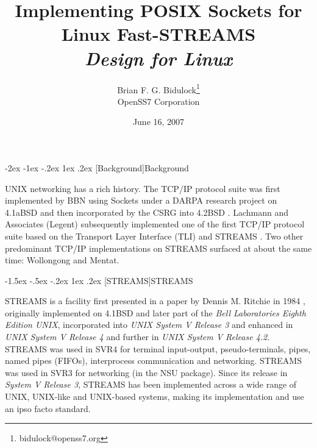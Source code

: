 \documentclass[letterpaper,final,notitlepage,twocolumn,10pt,twoside]{article}
\makeatletter
\renewcommand\section{\@startsection {section}{1}{\z@}%
                                   {-2ex \@plus -1ex \@minus -.2ex}%
                                   {1ex \@plus .2ex}%
                                   {\normalfont\large\bfseries}}
\renewcommand\subsection{\@startsection{subsection}{2}{\z@}%
                                     {-1.5ex \@plus -.5ex \@minus -.2ex}%
                                     {1ex \@plus .2ex}%
                                     {\normalfont\normalsize\bfseries}}
\makeatother
\begin{document}

\title{Implementing POSIX Sockets for Linux Fast-STREAMS\\[0.5ex]
	{\large \textsl{Design for Linux}}}
\author{Brian F. G. Bidulock\thanks{bidulock@openss7.org}\\
	OpenSS7 Corporation}
\date{June 16, 2007}
\maketitle

\begin{abstract}
\end{abstract}


\section[Background]{Background}

UNIX networking has a rich history.  The TCP/IP protocol suite was first
implemented by BBN using Sockets under a DARPA research project on 4.1aBSD and
then incorporated by the CSRG into 4.2BSD \cite[]{bsd}.  Lachmann and
Associates (Legent) subsequently implemented one of the first TCP/IP protocol
suite based on the Transport Layer Interface (TLI) \cite[]{tli} and STREAMS
\cite[]{magic}.  Two other predominant TCP/IP implementations on STREAMS
surfaced at about the same time: Wollongong and Mentat.

\subsection[STREAMS]{STREAMS}

STREAMS is a facility first presented in a paper by Dennis M. Ritchie in 1984
\cite[]{Ritchie84}, originally implemented on 4.1BSD and later part of the
\textsl{Bell Laboratories Eighth Edition UNIX}, incorporated into \textsl{UNIX
System V Release 3} and enhanced in \textsl{UNIX System V Release 4} and
further in \textsl{UNIX System V Release 4.2}.  STREAMS was used in SVR4 for
terminal input-output, pseudo-terminals, pipes, named pipes (FIFOs),
interprocess communication and networking.  STREAMS was used in SVR3 for
networking (in the NSU package).  Since its release in \textsl{System V
Release 3}, STREAMS has been implemented across a wide range of UNIX,
UNIX-like and UNIX-based systems, making its implementation and use an ipso
facto standard.
\end{document}
